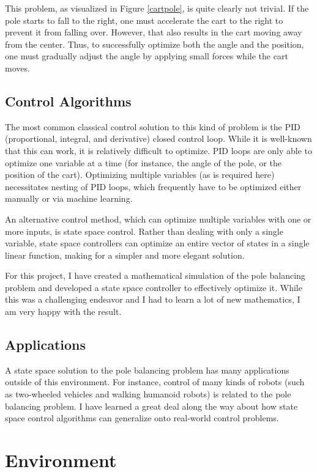 \documentclass[12pt]{article}
\begin{document}
This problem, as visualized in Figure \ref{cartpole}, is quite clearly not trivial. If the pole starts to fall to the right, one must accelerate the cart to the right to prevent it from falling over. However, that also results in the cart moving away from the center. Thus, to successfully optimize both the angle and the position, one must gradually adjust the angle by applying small forces while the cart moves.

\subsection{Control Algorithms}

The most common classical control solution to this kind of problem is the PID (proportional, integral, and derivative) closed control loop. While it is well-known that this can work, it is relatively difficult to optimize. PID loops are only able to optimize one variable at a time (for instance, the angle of the pole, or the position of the cart). Optimizing multiple variables (as is required here) necessitates nesting of PID loops, which frequently have to be optimized either manually or via machine learning.

An alternative control method, which can optimize multiple variables with one or more inputs, is state space control. Rather than dealing with only a single variable, state space controllers can optimize an entire vector of states in a single linear function, making for a simpler and more elegant solution.

For this project, I have created a mathematical simulation of the pole balancing problem and developed a state space controller to effectively optimize it. While this was a challenging endeavor and I had to learn a lot of new mathematics, I am very happy with the result.

\subsection{Applications}

A state space solution to the pole balancing problem has many applications outside of this environment. For instance, control of many kinds of robots (such as two-wheeled vehicles and walking humanoid robots) is related to the pole balancing problem. I have learned a great deal along the way about how state space control algorithms can generalize onto real-world control problems.

\section{Environment}
\end{document}
